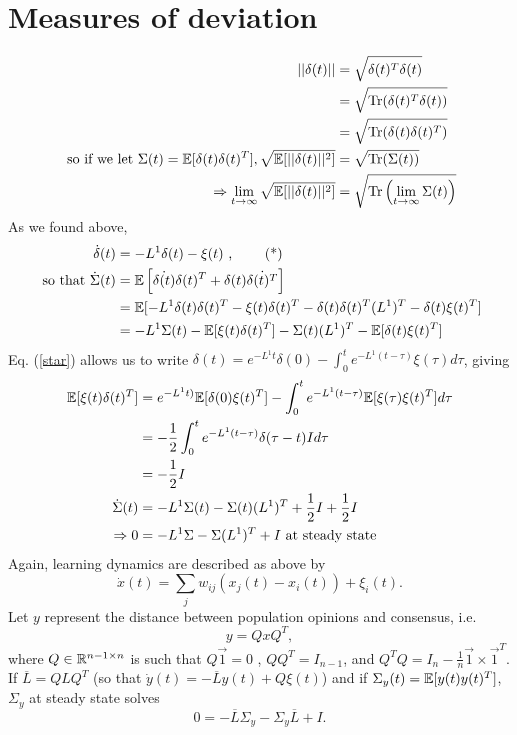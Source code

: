 \documentclass{article}
\newcommand{\Tr}{\text{Tr}}
\begin{document}
\section{Measures of deviation\label{deviations}}
\cite{Young:2010fk}
\begin{align*}
||\delta(t)||&=\sqrt{\delta(t)^T\delta(t)}
\\&=\sqrt{\Tr(\delta(t)^T\delta(t))}
\\&=\sqrt{\Tr(\delta(t)\delta(t)^T)}
\\ \text{ so if we let }\Sigma(t)=\E[\delta(t)\delta(t)^T], \sqrt{\E[||\delta(t)||^2]}&=\sqrt{\Tr(\Sigma(t))}
\\ \Rightarrow \lim_{t\to\infty}\sqrt{\E[||\delta(t)||^2]}&=\sqrt{\Tr\left(\lim_{t\to\infty}\Sigma(t)\right)}
\end{align*}
As we found above,
\begin{align*}
\dot{\delta}(t)&=-L^1\delta(t)-\xi(t) \text{ , } \tag{*} \label{star}
\\ \text{ so that } \dot{\Sigma}(t)&={\mathbb{E}}\left[\dot{\delta(t)}\delta(t)^T+\delta(t)\dot{\delta(t)^T}\right]
\\&={\mathbb{E}}[-L^1\delta(t)\delta(t)^T-\xi(t)\delta(t)^T-\delta(t)\delta(t)^T(L^1)^T-\delta(t)\xi(t)^T]
\\&=-L^1\Sigma(t)-{\mathbb{E}}[\xi(t)\delta(t)^T]-\Sigma(t)(L^1)^T-{\mathbb{E}}[\delta(t)\xi(t)^T]
\end{align*}
Eq. (\ref{star}) allows us to write $\delta(t)=e^{-L^1t}\delta(0)-\int_0^te^{-L^1(t-\tau)}\xi(\tau)d\tau$, giving 
\begin{align*}
{\mathbb{E}}[\xi(t)\delta(t)^T]&=e^{-L^1t)}{\mathbb{E}}[\delta(0)\xi(t)^T]-\int_0^te^{-L^1(t-\tau)}{\mathbb{E}}[\xi(\tau)\xi(t)^T]d\tau
\\&=-\frac{1}{2}\int_0^te^{-L^1(t-\tau)}\delta(\tau-t)Id\tau
\\&=-\frac{1}{2}I
\\\dot{\Sigma}(t)&=-L^1\Sigma(t)-\Sigma(t)(L^1)^T+\frac{1}{2}I+\frac{1}{2}I
\\\Rightarrow 0&=-L^1\Sigma-\Sigma(L^1)^T+I \text{ at steady state}
\end{align*}
Again, learning dynamics are described as above by 
$$\dot{x}(t)=\sum_jw_{ij}(x_j(t)-x_i(t))+\xi_i(t).$$
Let $y$ represent the distance between population opinions and consensus, i.e.
$$y=QxQ^T,$$
where $Q\in{\mathbb{R}}^{n-1\times n}$ is such that $Q\vec{1}=0$ , $QQ^T=I_{n-1}$, and $Q^TQ=I_n-\frac{1}{n}\vec{1}\times\vec{1}^T$.   
If $\overline{L}=QLQ^T$ (so that $\dot{y}(t)=-\overline{L}y(t)+Q\xi(t)$) 
and if $\Sigma_y(t)={\mathbb{E}}[y(t)y(t)^T]$, $\Sigma_y$ at steady state solves
$$0=-\overline{L}\Sigma_y-\Sigma_y\overline{L}+I.$$
\end{document}
